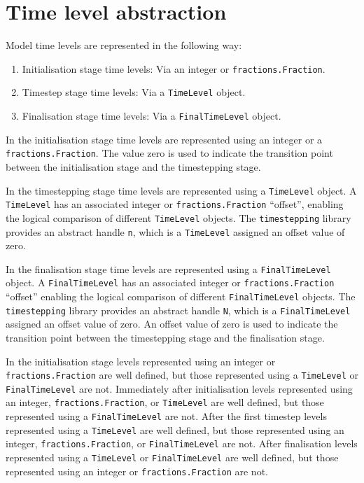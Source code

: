 \documentclass[a4paper]{book}
\begin{document}
\section{Time level abstraction}

Model time levels are represented in the following way:
\begin{enumerate}
  \item Initialisation stage time levels: Via an integer or
        \verb+fractions.Fraction+.
  \item Timestep stage time levels: Via a \verb+TimeLevel+ object.
  \item Finalisation stage time levels: Via a \verb+FinalTimeLevel+ object.
\end{enumerate}

In the initialisation stage time levels are represented using an integer
or a \verb+fractions.Fraction+. The value zero is used to indicate the
transition point between the initialisation stage and the timestepping stage.

In the timestepping stage time levels are represented using a \verb+TimeLevel+
object. A \verb+TimeLevel+ has an associated integer or
\verb+fractions.Fraction+ ``offset'', enabling the logical comparison of
different \verb+TimeLevel+ objects. The \verb+timestepping+ library provides
an abstract handle \verb+n+, which is a \linebreak \verb+TimeLevel+ assigned an
offset value of zero.

In the finalisation stage time levels are represented using a
\verb+FinalTimeLevel+ object. A \verb+FinalTimeLevel+ has an associated integer
or \verb+fractions.Fraction+ ``offset'' enabling the logical comparison of
different \verb+FinalTimeLevel+ objects. The \verb+timestepping+ library
provides an abstract handle \verb+N+, which is a \linebreak
\verb+FinalTimeLevel+ assigned an offset value of zero. An offset value of zero
is used to indicate the transition point between the timestepping stage and the
finalisation stage.

In the initialisation stage levels represented using an integer or \linebreak
\verb+fractions.Fraction+ are well defined, but those represented using a
\verb+TimeLevel+ or \verb+FinalTimeLevel+ are not. Immediately after
initialisation levels represented using an integer, \verb+fractions.Fraction+,
or \verb+TimeLevel+ are well defined, but those represented using a
\verb+FinalTimeLevel+ are not. After the first timestep levels represented using
a \verb+TimeLevel+ are well defined, but those represented using an integer,
\verb+fractions.Fraction+, or \verb+FinalTimeLevel+ are not. After finalisation
levels represented using a \verb+TimeLevel+ or \verb+FinalTimeLevel+ are well
defined, but those represented using an integer or \verb+fractions.Fraction+ are
not.
\end{document}
